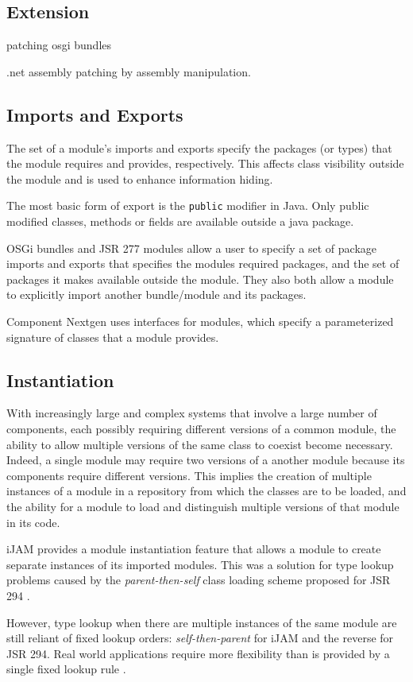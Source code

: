 \subsection{Extension}

\cite{patchingosgi} patching osgi bundles

\cite{reflexil} \cite{monocecil} .net assembly patching by assembly manipulation.

\subsection{Imports and Exports}

The set of a module's imports and exports specify the packages (or types) that
the module requires and provides, respectively. This affects class
visibility outside the module and is used to enhance information hiding. 

The most basic form of export is the {\tt public} modifier in Java. Only
public modified classes, methods or fields are available outside a java package.

OSGi bundles and JSR 277 modules allow a user to specify a set of package imports 
and exports that specifies the modules required packages, and the set of packages 
it makes available outside the module. They also both allow a module
to explicitly import another bundle/module and its packages.

Component Nextgen \cite{componentnextgen} uses interfaces for modules, which
specify a parameterized signature of classes that a module provides.

\subsection{Instantiation}
With increasingly large and complex systems that involve a large number of components,
each possibly requiring different versions of a common module,
the ability to allow multiple versions of the same class to coexist become necessary.
Indeed, a single module may require two versions of a another module because its
components require different versions. This implies the creation of multiple instances 
of a module in a repository from which the classes are to be loaded, and the ability
for a module to load and distinguish multiple versions of that module in its code.

iJAM \cite{iJAM} provides a module instantiation feature that allows a module to create
separate instances of its imported modules. This was a solution for type lookup
problems caused by the {\it parent-then-self} class loading scheme proposed for
JSR 294 \cite{JSR294}.

However, type lookup when there are multiple instances of the same module are still
reliant of fixed lookup orders: {\it self-then-parent} for iJAM and the reverse for JSR 294.
Real world applications require more flexibility than is provided by a single fixed
lookup rule \cite{iJAMComments}.